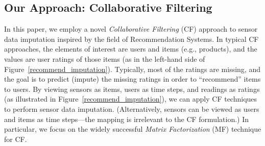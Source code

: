



\subsection{Our Approach: Collaborative Filtering}

In this paper, we employ a novel {\em Collaborative Filtering} (CF) approach
to sensor data imputation inspired by the field of Recommendation
Systems.  In typical CF approaches, the elements of interest are users
and items (e.g., products), and the values are user ratings of those
items (as in the left-hand side of
Figure~\ref{recommend_imputation}).  Typically, most of the ratings
are missing, and the goal is to predict (impute) the missing ratings
in order to ``recommend'' items to users.  By viewing sensors as
items, users as time steps, and readings as ratings (as illustrated in
Figure~\ref{recommend_imputation}), we can apply CF
techniques to perform sensor data imputation. (Alternatively, sensors
can be viewed as users and items as time steps---the mapping is
irrelevant to the CF formulation.)  In particular, we focus on the
widely successful {\em Matrix Factorization} (MF) technique for CF.

